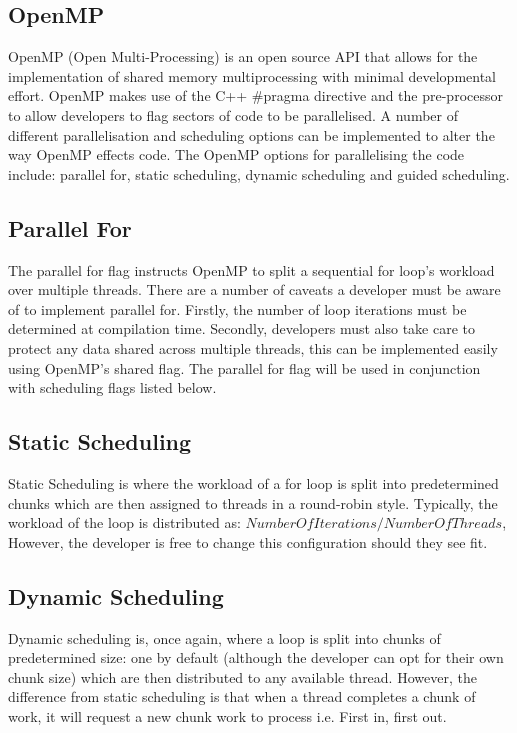 \documentclass[journal,transmag]{IEEEtran}
\begin{document}
	\subsection{OpenMP}
		OpenMP (Open Multi-Processing) is an open source API that allows for the implementation of shared memory multiprocessing with minimal developmental effort. OpenMP makes use of the C++ \#pragma directive and the pre-processor to allow developers to flag sectors of code to be parallelised. A number of different parallelisation and scheduling options can be implemented to alter the way OpenMP effects code. The OpenMP options for parallelising the code include: parallel for, static scheduling, dynamic scheduling and guided scheduling.   
	
	\subsection{Parallel For}
		The parallel for flag instructs OpenMP to split a sequential for loop’s workload over multiple threads. There are a number of caveats a developer must be aware of to implement parallel for. Firstly, the number of loop iterations must be determined at compilation time. Secondly, developers must also take care to protect any data shared across multiple threads, this can be implemented easily using OpenMP’s shared flag. The parallel for flag will be used in conjunction with scheduling flags listed below.
	
	\subsection{Static Scheduling}
		Static Scheduling is where the workload of a for loop is split into predetermined chunks which are then assigned to threads in a round-robin style. Typically, the workload of the loop is distributed as:
		\(Number Of Iterations / Number Of Threads\),
		However, the developer is free to change this configuration should they see fit.
	
	\subsection{Dynamic Scheduling}
		Dynamic scheduling is, once again, where a loop is split into chunks of predetermined size: one by default (although the developer can opt for their own chunk size) which are then distributed to any available thread. However, the difference from static scheduling is that when a thread completes a chunk of work, it will request a new chunk work to process i.e. First in, first out.
	
\end{document}
